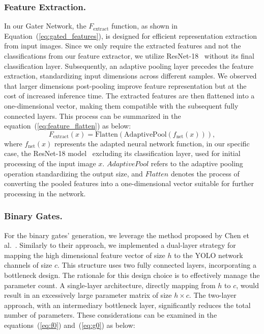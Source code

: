 \documentclass[runningheads]{llncs}
\begin{document}
\subsubsection{Feature Extraction.} In our Gater Network, the \( F_{\text{extract}} \) function, as shown in Equation~(\ref{eq:gated_features}), is designed for efficient representation extraction from input images. Since we only require the extracted features and not the classifications from our feature extractor, we utilize ResNet-18~\cite{he2016deep} without its final classification layer. Subsequently, an adaptive pooling layer precedes the feature extraction, standardizing input dimensions across different samples. We observed that larger dimensions post-pooling improve feature representation but at the cost of increased inference time. The extracted features are then flattened into a one-dimensional vector, making them compatible with the subsequent fully connected layers. This process can be summarized in the equation~(\ref{eq:feature_flatten}) as below:\begin{equation}
    F_{\text{extract}}(x) = \text{Flatten}(\text{AdaptivePool}(f_{\text{net}}(x))),
    \label{eq:feature_flatten}
\end{equation}where \( f_{\text{net}}(x) \) represents the adapted neural network function, in our specific case, the ResNet-18 model~\cite{he2016deep} excluding its classification layer, used for initial processing of the input image \( x \). $AdaptivePool$ refers to the adaptive pooling operation standardizing the output size, and $Flatten$ denotes the process of converting the pooled features into a one-dimensional vector suitable for further processing in the network.

\subsubsection*{Binary Gates.} For the binary gates’ generation, we leverage the method proposed by Chen et al.~\cite{chen2019you}. Similarly to their approach, we implemented a dual-layer strategy for mapping the high dimensional feature vector of size \( h \) to the YOLO network channels of size \( c \). This structure uses two fully connected layers, incorporating a bottleneck design. The rationale for this design choice is to effectively manage the parameter count. A single-layer architecture, directly mapping from \( h \) to \( c \), would result in an excessively large parameter matrix of size \( h \times c \). The two-layer approach, with an intermediary bottleneck layer, significantly reduces the total number of parameters. These considerations can be examined in the equations~(\ref{eq:f0}) and~(\ref{eq:g0}) as below:
\end{document}
